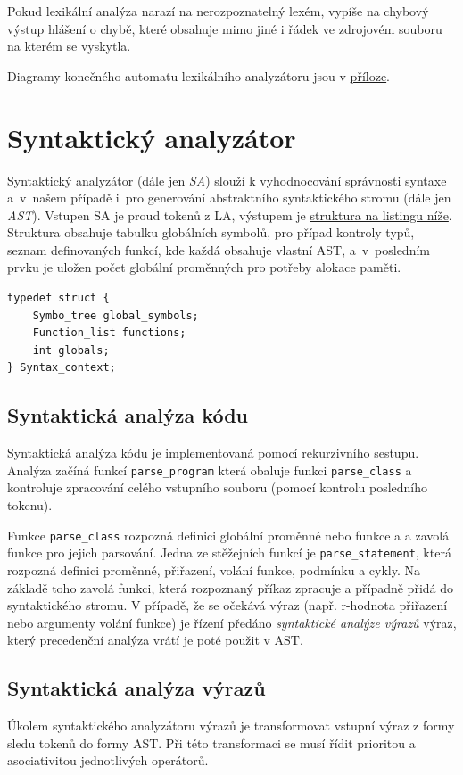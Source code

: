\documentclass[a4paper,11pt]{article}
\begin{document}
Pokud lexikální analýza narazí na nerozpoznatelný lexém, vypíše na chybový výstup hlášení o chybě, které obsahuje mimo jiné i řádek ve zdrojovém souboru na kterém se vyskytla.

Diagramy konečného automatu lexikálního analyzátoru jsou v \hyperref[diag:LA-FSM]{příloze}.


\section{Syntaktický analyzátor}
Syntaktický analyzátor (dále jen \textit{SA}) slouží k vyhodnocování správnosti syntaxe a~v~našem případě i~pro generování abstraktního syntaktického stromu (dále jen \textit{AST}). Vstupen SA je proud tokenů z LA, výstupem je \hyperref[lst:saOut]{struktura na listingu níže}. Struktura obsahuje tabulku globálních symbolů, pro případ kontroly typů, seznam definovaných funkcí, kde každá obsahuje vlastní AST, a~v~posledním prvku je uložen počet globální proměnných pro potřeby alokace paměti.

\begin{lstlisting}[caption={Výstupní struktura SA}, label={lst:saOut}]
typedef struct {
	Symbo_tree global_symbols;
	Function_list functions;
	int globals;
} Syntax_context;
\end{lstlisting}

\subsection{Syntaktická analýza kódu}
Syntaktická analýza kódu je implementovaná pomocí rekurzivního sestupu. Analýza začíná funkcí \texttt{parse\_program} která obaluje funkci \texttt{parse\_class} a kontroluje zpracování celého vstupního souboru (pomocí kontrolu posledního tokenu).

Funkce \texttt{parse\_class} rozpozná definici globální proměnné nebo funkce a a zavolá funkce pro jejich parsování. Jedna ze stěžejních funkcí je \texttt{parse\_statement}, která rozpozná definici proměnné, přiřazení, volání funkce, podmínku a cykly. Na základě toho zavolá funkci, která rozpoznaný příkaz zpracuje a případně přidá do syntaktického stromu. V případě, že se očekává výraz (např. r-hodnota přiřazení nebo argumenty volání funkce) je řízení předáno \emph{syntaktické analýze výrazů} výraz, který precedenční analýza vrátí je poté použit v AST.

\subsection{Syntaktická analýza výrazů}
Úkolem syntaktického analyzátoru výrazů je transformovat vstupní výraz z formy sledu tokenů do formy AST. Při této transformaci se musí řídit prioritou a asociativitou jednotlivých operátorů.
\end{document}
